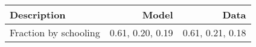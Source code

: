 \begin{tabular}{lrr}
\hline
Description & Model  & Data  \\ 
\hline
Fraction by schooling & 0.61, 0.20, 0.19  & 0.61, 0.21, 0.18  \\ 
\hline
\end{tabular}%
